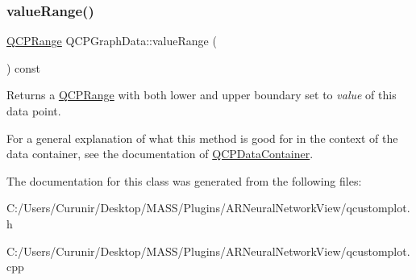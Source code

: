 \subsubsection{\texorpdfstring{value\+Range()}{valueRange()}}
{\footnotesize\ttfamily \hyperlink{class_q_c_p_range}{Q\+C\+P\+Range} Q\+C\+P\+Graph\+Data\+::value\+Range (\begin{DoxyParamCaption}{ }\end{DoxyParamCaption}) const\hspace{0.3cm}{\ttfamily [inline]}}

Returns a \hyperlink{class_q_c_p_range}{Q\+C\+P\+Range} with both lower and upper boundary set to {\itshape value} of this data point.

For a general explanation of what this method is good for in the context of the data container, see the documentation of \hyperlink{class_q_c_p_data_container}{Q\+C\+P\+Data\+Container}. 

The documentation for this class was generated from the following files\+:\begin{DoxyCompactItemize}
\item 
C\+:/\+Users/\+Curunir/\+Desktop/\+M\+A\+S\+S/\+Plugins/\+A\+R\+Neural\+Network\+View/qcustomplot.\+h\item 
C\+:/\+Users/\+Curunir/\+Desktop/\+M\+A\+S\+S/\+Plugins/\+A\+R\+Neural\+Network\+View/qcustomplot.\+cpp\end{DoxyCompactItemize}
